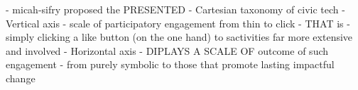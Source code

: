 - micah-sifry proposed the PRESENTED 
- Cartesian taxonomy of civic tech
- Vertical axis - scale of participatory engagement from thin to click
      - THAT is - simply clicking a like button (on the one hand)
        to sactivities far more extensive and involved
- Horizontal axis - DIPLAYS A SCALE OF outcome of such engagement - 
      from purely symbolic to those that promote lasting impactful change